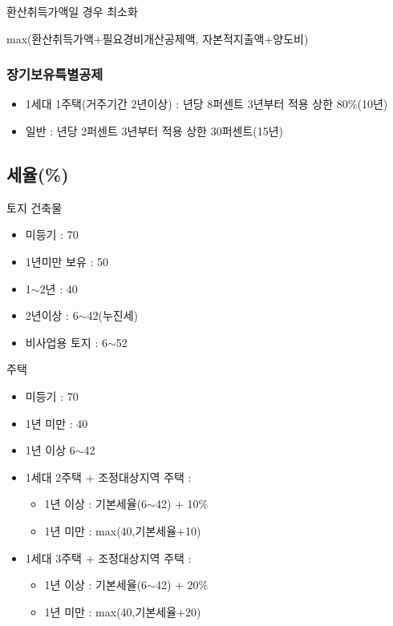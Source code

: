 \documentclass{oblivoir}
\begin{document}
\begin{multicols}{2}
환산취득가액일 경우 최소화

max(환산취득가액+필요경비개산공제액, 자본적지출액+양도비)

\subsubsection{장기보유특별공제}\label{uxc7a5uxae30uxbcf4uxc720uxd2b9uxbcc4uxacf5uxc81c}

\begin{itemize}
\itemsep1pt\parskip0pt
\item
  1세대 1주택(거주기간 2년이상) : 년당 8퍼센트 3년부터 적용 상한
  80\%(10년)
\item
  일반 : 년당 2퍼센트 3년부터 적용 상한 30퍼센트(15년)
\end{itemize}

\subsection{세율(\%)}\label{uxc138uxc728-3}

토지 건축물

\begin{itemize}
\itemsep1pt\parskip0pt
\item
  미등기 : 70
\item
  1년미만 보유 : 50
\item
  1$\sim$2년 : 40
\item
  2년이상 : 6$\sim$42(누진세)
\item
  비사업용 토지 : 6$\sim$52
\end{itemize}

주택

\begin{itemize}
\itemsep1pt\parskip0pt
\item
  미등기 : 70
\item
  1년 미만 : 40
\item
  1년 이상 6$\sim$42
\item
  1세대 2주택 + 조정대상지역 주택 :

  \begin{itemize}
  \itemsep1pt\parskip0pt
  \item
    1년 이상 : 기본세율(6$\sim$42) + 10\%
  \item
    1년 미만 : max(40,기본세율+10)
  \end{itemize}
\item
  1세대 3주택 + 조정대상지역 주택 :

  \begin{itemize}
  \itemsep1pt\parskip0pt
  \item
    1년 이상 : 기본세율(6$\sim$42) + 20\%
  \item
    1년 미만 : max(40,기본세율+20)
  \end{itemize}
\end{itemize}


\end{multicols}
\end{document}
